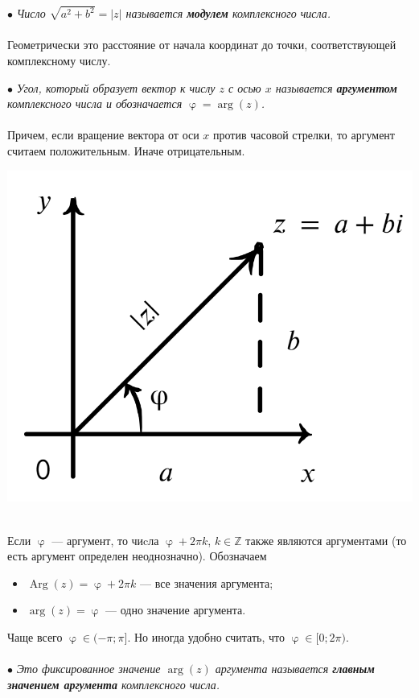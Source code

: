 \documentclass[a4paper, 12pt]{article}
\newcommand{\Z}{\mathbb{Z}}
\renewcommand{\varphi}{\upvarphi}
\newcommand{\Arg}{\operatorname{Arg}}
\begin{document}
$\bullet$ \textit{Число $\sqrt{a^2 + b^2} = |z|$ называется \textbf{модулем} комплексного числа.}\\\\
Геометрически это расстояние от начала координат до точки, соответствующей комплексному числу.\\
\noindent
\parbox[b][4.5cm][t]{95mm}{
	$\bullet$ \textit{Угол, который образует вектор к числу $z$ с осью $x$ называется \textbf{аргументом} комплексного числа и обозначается $\varphi = \arg (z)$.}\\\\
	Причем, если вращение вектора от оси $x$ против часовой стрелки, то аргумент считаем положительным. Иначе отрицательным.
	}
\hfill
\parbox[b][5cm][t]{70mm}{
	\includegraphics[scale=0.38]{images/003.png}}\\
 Если $\varphi$ --- аргумент, то чиcла $\varphi + 2\pi k$, $k\in \Z$ также являются аргументами (то есть аргумент определен неоднозначно). Обозначаем \begin{itemize}
	\item $\Arg(z) = \varphi + 2\pi k$ --- все значения аргумента;
	\item $\arg (z) = \varphi$ --- одно значение аргумента.
\end{itemize}
Чаще всего $\varphi \in (-\pi; \pi]$. Но иногда удобно считать, что $\varphi \in [0;2\pi)$.\\\\
$\bullet$ \textit{Это фиксированное значение $\arg (z)$ аргумента  называется \textbf{главным значением аргумента} комплексного числа.}\\\\
\end{document}
